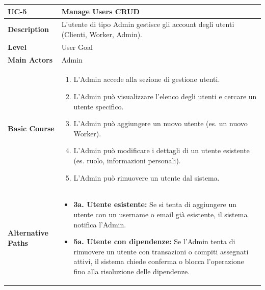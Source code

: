 \begin{table}[H]
\centering
\begin{tabularx}{\textwidth}{|p{2.5cm}|X|}
\hline
\textbf{UC-5} & \textbf{Manage Users CRUD} \\
\hline
\textbf{Description} & L'utente di tipo Admin gestisce gli account degli utenti (Clienti, Worker, Admin). \\
\hline
\textbf{Level} & User Goal \\
\hline
\textbf{Main Actors} & Admin \\
\hline
\textbf{Basic Course} &
\begin{enumerate}
    \item L'Admin accede alla sezione di gestione utenti.
    \item L'Admin può visualizzare l'elenco degli utenti  e cercare un utente specifico.
    \item L'Admin può aggiungere un nuovo utente (es. un nuovo Worker).
    \item L'Admin può modificare i dettagli di un utente esistente (es. ruolo, informazioni personali).
    \item L'Admin può rimuovere un utente dal sistema.
\end{enumerate} \\
\hline
\textbf{Alternative Paths} &
\begin{itemize}
    \item \textbf{3a. Utente esistente:} Se si tenta di aggiungere un utente con un username o email già esistente, il sistema notifica l'Admin.
    \item \textbf{5a. Utente con dipendenze:} Se l'Admin tenta di rimuovere un utente con transazioni o compiti assegnati attivi, il sistema chiede conferma o blocca l'operazione fino alla risoluzione delle dipendenze.
\end{itemize} \\
\hline
\end{tabularx}
\end{table}

